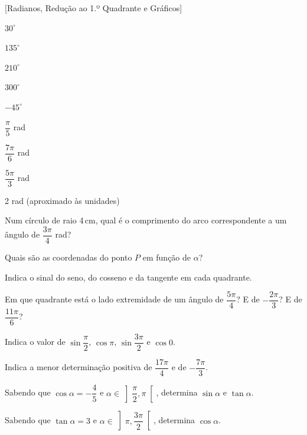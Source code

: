 \documentclass[12pt]{article}
\begin{document}
[Radianos, Redução ao 1.º Quadrante e Gráficos]


\begin{exercicios}
  \item $30^\circ$
  \item $135^\circ$
  \item $210^\circ$
  \item $300^\circ$
  \item $-45^\circ$
  \item $\dfrac{\pi}{5}$ rad
  \item $\dfrac{7\pi}{6}$ rad
  \item $\dfrac{5\pi}{3}$ rad
  \item 2 rad (aproximado às unidades)
  \item Num círculo de raio 4\,cm, qual é o comprimento do arco correspondente a um ângulo de $\dfrac{3\pi}{4}$ rad?
\end{exercicios}


\begin{center}
\end{center}

\begin{exercicios}
  \item Quais são as coordenadas do ponto $P$ em função de $\alpha$?
  \item Indica o sinal do seno, do cosseno e da tangente em cada quadrante.
  \item Em que quadrante está o lado extremidade de um ângulo de $\dfrac{5\pi}{4}$? E de $-\dfrac{2\pi}{3}$? E de $\dfrac{11\pi}{6}$?
  \item Indica o valor de $\sin \dfrac{\pi}{2}$, $\cos \pi$, $\sin \dfrac{3\pi}{2}$ e $\cos 0$.
  \item Indica a menor determinação positiva de $\dfrac{17\pi}{4}$ e de $-\dfrac{7\pi}{3}$.
  \item Sabendo que $\cos \alpha = -\dfrac{4}{5}$ e $\alpha \in \left]\dfrac{\pi}{2}, \pi\right[$, determina $\sin \alpha$ e $\tan \alpha$.
  \item Sabendo que $\tan \alpha = 3$ e $\alpha \in \left]\pi, \dfrac{3\pi}{2}\right[$, determina $\cos \alpha$.
\end{exercicios}
\end{document}
